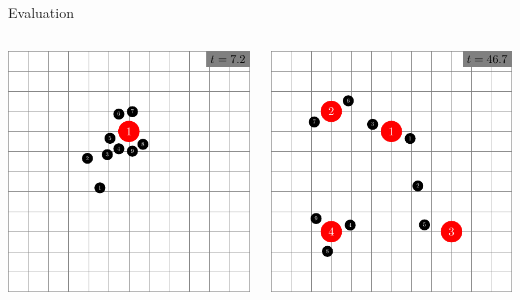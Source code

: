 \documentclass[aspectratio=1610,mathserif]{beamer}
\begin{document}
\begin{frame}{Evaluation}
\begin{columns}
\begin{column}{0.33\textwidth}
            \includegraphics[width=\textwidth]{sim73.pdf}
        \end{column}
        \begin{column}{0.33\textwidth}
            \includegraphics[width=\textwidth]{sim468.pdf}
        \end{column}
    \end{columns}
\end{frame}
\end{document}
